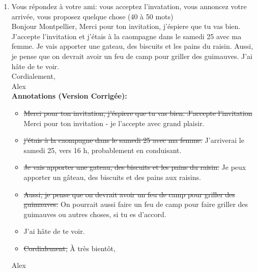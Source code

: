 \documentclass{book}
\begin{document}
        \begin{enumerate}
            \item Vous répondez à votre ami: vous acceptez l'invatation, vous annoncez votre arrivée, vous proposez quelque chose (40 à 50 mots) \\
                    Bonjour Montpellier,
                    Merci pour ton invitation, j'éspiere que tu vas bien. J'accepte l'invitation et j'étais à la caompagne dans le samedi 25 avec ma femme. Je vais apporter une gateau, des biscuits et les pains du raisin. Aussi, je pense que on devrait avoir un feu de camp pour griller des guimauves.
                    J'ai hâte de te voir. \\
                    Cordialement, \\
                    Alex \\
                    \medskip 
                    \textbf{Annotations (Version Corrigée):}
                    \begin{itemize}
                        \item \sout{Merci pour ton invitation, j'éspiere que tu vas bien. J'accepte l'invitation} Merci pour ton invitation - je l'accepte avec grand plaisir.
                        \item \sout{j'étais à la caompagne dans le samedi 25 avec ma femme.} J'arriverai le samedi 25, vers 16 h, probablement en conduisant.
                        \item \sout{Je vais apporter une gateau, des biscuits et les pains du raisin.} Je peux apporter un gâteau, des biscuits et des pains aux raisins.
                        \item \sout{Aussi, je pense que on devrait avoir un feu de camp pour griller des guimauves.} On pourrait aussi faire un feu de camp pour faire griller des guimauves ou autres choses, si tu es d'accord.
                        \item J'ai hâte de te voir.
                        \item \sout{Cordialement,} À très bientôt,
                    \end{itemize}
                    Alex
        \end{enumerate}
    \newpage
\end{document}
